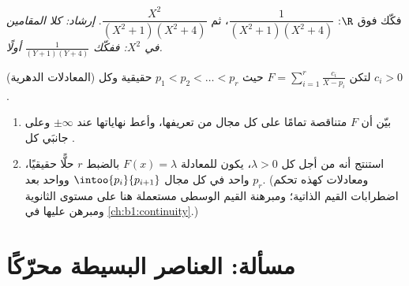 \begin{exercise}[$\star\star$]\label{exo:b1:fractions:11}
فكّك فوق $\R$: $\dfrac{1}{(X^2+1)(X^2+4)}$، ثم
$\dfrac{X^2}{(X^2+1)(X^2+4)}$. \emph{إرشاد: كلا المقامين  في $X^2$: ففكّك $\frac1{(Y+1)(Y+4)}$ أولًا.}
\end{exercise}

\begin{exercise}[$\star\star\star$]\label{exo:b1:fractions:12}
(المعادلات الدهرية) لتكن $F = \sum_{i=1}^{r} \frac{c_i}{X - p_i}$
حيث $p_1 < p_2 < \dots < p_r$ حقيقية وكل $c_i > 0$.
\begin{enumerate}
  \item بيّن أن $F$ متناقصة تمامًا على كل مجال من
         تعريفها، وأعط نهاياتها عند $\pm\infty$ وعلى جانبَي
        كل .
  \item استنتج أنه من أجل كل $\lambda > 0$، يكون للمعادلة $F(x) =
        \lambda$ بالضبط $r$ حلًّا حقيقيًا، واحد في كل
        مجال $\intoo{p_i}{p_{i+1}}$ وواحد بعد $p_r$.
        (ومعادلات كهذه تحكم اضطرابات القيم الذاتية؛ ومبرهنة
        القيم الوسطى مستعملة هنا على مستوى الثانوية
        ومبرهن عليها في \cref{ch:b1:continuity}.)
\end{enumerate}
\end{exercise}

\section{مسألة: العناصر البسيطة محرّكًا}

